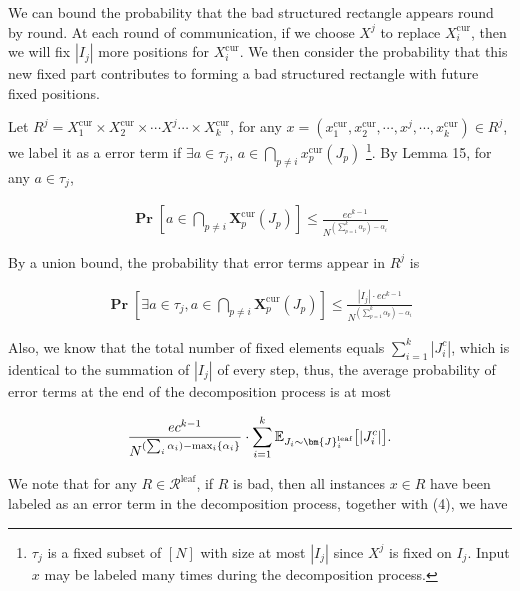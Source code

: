 We can bound the probability that the bad structured rectangle appears round by round. At each round of communication, if we choose $X^{j}$ to replace $X_{i}^{\text{cur}}$, then we will fix $|I_{j}|$ more positions for $X_{i}^{\text{cur}}$. We then consider the probability that this new fixed part contributes to forming a bad structured rectangle with future fixed positions.\par




Let $R^{j}=X_{1}^{\text{cur}}\times X_{2}^{\text{cur}}\times\cdots X^{j}\cdots\times X_{k}^{\text{cur}}$, for any $x=(x_{1}^{\text{cur}},x_{2}^{\text{cur}},\cdots,x^{j},\cdots,x_{k}^{\text{cur}})\in R^{j}$, we label it as a error term if $\exists a\in\tau_{j}$, $a\in\bigcap_{p\neq i}x_{p}^{\text{cur}}(J_{p})$ \footnote{ $\tau_{j}$ is a fixed subset of $[N]$ with size at most $|I_{j}|$ since $X^{j}$ is fixed on $I_{j}$. Input $x$ may be labeled many times during the decomposition process.}. By Lemma 15, for any $a\in\tau_{j}$,\par


\[\begin{gathered}
\operatorname*{\mathbf{Pr}}[a\in\bigcap_{p\neq i}\bm{X}_{p}^{\text{cur}}(J_{p})]\leq\frac{ec^{k-1}}{N^{(\sum_{p=1}^{k}\alpha_{p})-\alpha_{i}}}
\end{gathered}\]


By a union bound, the probability that error terms appear in $R^{j}$ is\par


\[\begin{gathered}
\operatorname*{\mathbf{Pr}}[\exists a\in\tau_{j},a\in\bigcap_{p\neq i}\bm{X}_{p}^{\text{cur}}(J_{p})]\leq\frac{|I_{j}|\cdot ec^{k-1}}{N^{(\sum_{p=1}^{k}\alpha_{p})-\alpha_{i}}}
\end{gathered}\]


Also, we know that the total number of fixed elements equals $\sum_{i=1}^{k}|J_{i}^{c}|$, which is identical to the summation of $|I_{j}|$ of every step, thus, the average probability of error terms at the end of the decomposition process is at most\par


\[\begin{gathered}
\frac{ec^{k-1}}{N^{(\sum_{i}\alpha_{i})-\mathop{\max}_{i}\{\alpha_{i}\}}}\cdot\sum_{i=1}^{k}\mathbb{E}_{J_{i}\sim\bm{J}_{i}^{\text{leaf}}}\big{[}|J_{i}^{c}|\big{]}.
\end{gathered}\]


We note that for any $R\in\mathcal{R}^{\text{leaf}}$, if $R$ is bad, then all instances $x\in R$ have been labeled as an error term in the decomposition process, together with (4), we have\par


